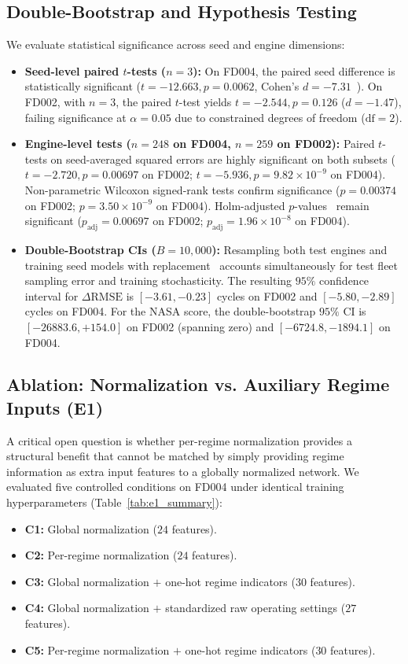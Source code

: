 \documentclass[conference]{IEEEtran}
\begin{document}
\subsection{Double-Bootstrap and Hypothesis Testing}
We evaluate statistical significance across seed and engine dimensions:
\begin{itemize}
    \item \textbf{Seed-level paired $t$-tests ($n=3$):} On FD004, the paired seed difference is statistically significant ($t = -12.663, p = 0.0062$, Cohen's $d = -7.31$~\cite{cohen1988power}). On FD002, with $n=3$, the paired $t$-test yields $t = -2.544, p = 0.126$ ($d = -1.47$), failing significance at $\alpha = 0.05$ due to constrained degrees of freedom ($\text{df}=2$).
    \item \textbf{Engine-level tests ($n=248$ on FD004, $n=259$ on FD002):} Paired $t$-tests on seed-averaged squared errors are highly significant on both subsets ($t = -2.720, p = 0.00697$ on FD002; $t = -5.936, p = 9.82 \times 10^{-9}$ on FD004). Non-parametric Wilcoxon signed-rank tests confirm significance ($p = 0.00374$ on FD002; $p = 3.50 \times 10^{-9}$ on FD004). Holm-adjusted $p$-values~\cite{holm1979sequential} remain significant ($p_{\text{adj}} = 0.00697$ on FD002; $p_{\text{adj}} = 1.96 \times 10^{-8}$ on FD004).
    \item \textbf{Double-Bootstrap CIs ($B=10{,}000$):} Resampling both test engines and training seed models with replacement~\cite{efron1993bootstrap} accounts simultaneously for test fleet sampling error and training stochasticity. The resulting $95\%$ confidence interval for $\Delta\text{RMSE}$ is $[-3.61, -0.23]$ cycles on FD002 and $[-5.80, -2.89]$ cycles on FD004. For the NASA score, the double-bootstrap $95\%$ CI is $[-26883.6, +154.0]$ on FD002 (spanning zero) and $[-6724.8, -1894.1]$ on FD004.
\end{itemize}

\subsection{Ablation: Normalization vs. Auxiliary Regime Inputs (E1)}
A critical open question is whether per-regime normalization provides a structural benefit that cannot be matched by simply providing regime information as extra input features to a globally normalized network. We evaluated five controlled conditions on FD004 under identical training hyperparameters (Table~\ref{tab:e1_summary}):
\begin{itemize}
    \item \textbf{C1:} Global normalization ($24$ features).
    \item \textbf{C2:} Per-regime normalization ($24$ features).
    \item \textbf{C3:} Global normalization $+$ one-hot regime indicators ($30$ features).
    \item \textbf{C4:} Global normalization $+$ standardized raw operating settings ($27$ features).
    \item \textbf{C5:} Per-regime normalization $+$ one-hot regime indicators ($30$ features).
\end{itemize}
\end{document}
